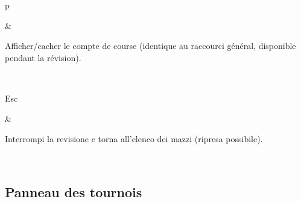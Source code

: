 \documentclass[letterpaper,10pt,italian]{sphinxmanual}
\begin{document}
\begin{savenotes}
\begin{tabular}[t]{}
\begin{varwidth}[t]{}
\sphinxAtStartPar
p
\sphinxbeforeendvarwidth
\end{varwidth}%
&\begin{varwidth}[t]{}
\sphinxAtStartPar
Afficher/cacher le compte de course (identique au raccourci général, disponible pendant la révision).
\sphinxbeforeendvarwidth
\end{varwidth}%
\\
\sphinxhline\begin{varwidth}[t]{}
\sphinxAtStartPar
Esc
\sphinxbeforeendvarwidth
\end{varwidth}%
&\begin{varwidth}[t]{}
\sphinxAtStartPar
Interrompi la revisione e torna all’elenco dei mazzi (ripresa possibile).
\sphinxbeforeendvarwidth
\end{varwidth}%
\\
\sphinxbottomrule
\end{tabular}
\sphinxtableafterendhook\par
\sphinxattableend\end{savenotes}


\subsection{Panneau des tournois}
\label{\detokenize{raccourcis:panneau-des-tournois}}\label{\detokenize{raccourcis:raccourcis-tournament-panel}}
\end{document}
